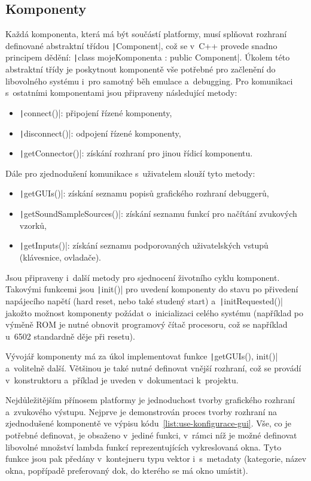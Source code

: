 \subsection{Komponenty}
Každá komponenta, která má být součástí platformy, musí splňovat rozhraní definované abstraktní třídou \texttt|Component|, což se v~C++ provede snadno principem dědění: \texttt|class mojeKomponenta : public Component|. Úkolem této abstraktní třídy je poskytnout komponentě vše potřebné pro začlenění do libovolného systému i~pro samotný běh emulace a~debugging. Pro komunikaci s~ostatními komponentami jsou připraveny následující metody:
\begin{itemize}
	\item \texttt|connect()|: připojení řízené komponenty,
	\item \texttt|disconnect()|: odpojení řízené komponenty,
	\item \texttt|getConnector()|: získání rozhraní pro jinou řídicí komponentu.
\end{itemize}

Dále pro zjednodušení komunikace s~uživatelem slouží tyto metody:
\begin{itemize}
	\item \texttt|getGUIs()|: získání seznamu popisů grafického rozhraní debuggerů,
	\item \texttt|getSoundSampleSources()|: získání seznamu funkcí pro načítání zvukových vzorků,
	\item \texttt|getInputs()|: získání seznamu podporovaných uživatelských vstupů (klávesnice, ovladače).
\end{itemize}

Jsou připraveny i~další metody pro sjednocení životního cyklu komponent. Takovými funkcemi jsou \texttt|init()| pro uvedení komponenty do stavu po přivedení napájecího napětí (hard reset, nebo také studený start) a~\texttt|initRequested()| jakožto možnost komponenty požádat o~inicializaci celého systému (například po výměně ROM je nutné obnovit programový čítač procesoru, což se například u~6502 standardně děje při resetu).

Vývojář komponenty má za úkol implementovat funkce \texttt|getGUIs(), init()| a~volitelně další. Většinou je také nutné definovat vnější rozhraní, což se provádí v~konstruktoru a~příklad je uveden v~dokumentaci k~projektu.

Nejdůležitějším přínosem platformy je jednoduchost tvorby grafického rozhraní a~zvukového výstupu. Nejprve je demonstrován proces tvorby rozhraní na zjednodušené komponentě ve výpisu kódu~\ref{list:use-konfigurace-gui}. Vše, co je potřebné definovat, je obsaženo v~jediné funkci, v~rámci níž je možné definovat libovolné množství lambda funkcí reprezentujících vykreslovaná okna. Tyto funkce jsou pak předány v~kontejneru typu vektor i~s~metadaty (kategorie, název okna, popřípadě preferovaný dok, do kterého se má okno umístit).

